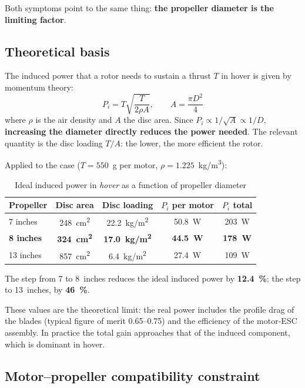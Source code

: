 Both symptoms point to the same thing: \textbf{the propeller diameter is the limiting factor}.

\subsection{Theoretical basis}
\label{subsec:propulsor-teoria}

The induced power that a rotor needs to sustain a thrust $T$ in hover is given by momentum theory:
\[
P_i = T \sqrt{\frac{T}{2\rho A}}, \qquad A = \frac{\pi D^2}{4}
\]
where $\rho$ is the air density and $A$ the disc area. Since $P_i \propto 1/\sqrt{A} \propto 1/D$, \textbf{increasing the diameter directly reduces the power needed}. The relevant quantity is the disc loading $T/A$: the lower, the more efficient the rotor.

Applied to the case ($T = 550$~g per motor, $\rho = 1.225$~kg/m\textsuperscript{3}):

\begin{table}[H]
    \centering
    \caption{Ideal induced power in \emph{hover} as a function of propeller diameter}
    \label{tab:potencia-induida}
    \small
    \begin{tabular}{lcccc}
        \toprule
        Propeller & Disc area & Disc loading & $P_i$ per motor & $P_i$ total \\
        \midrule
        7 inches & 248~cm\textsuperscript{2} & 22.2~kg/m\textsuperscript{2} & 50.8~W & 203~W \\
        \textbf{8 inches} & \textbf{324~cm\textsuperscript{2}} & \textbf{17.0~kg/m\textsuperscript{2}} & \textbf{44.5~W} & \textbf{178~W} \\
        13 inches & 857~cm\textsuperscript{2} & 6.4~kg/m\textsuperscript{2} & 27.4~W & 109~W \\
        \bottomrule
    \end{tabular}
\end{table}

The step from 7 to 8~inches reduces the ideal induced power by \textbf{12.4~\%}; the step to 13~inches, by \textbf{46~\%}.

These values are the theoretical limit: the real power includes the profile drag of the blades (typical figure of merit 0.65--0.75) and the efficiency of the motor-ESC assembly. In practice the total gain approaches that of the induced component, which is dominant in hover.

\subsection{Motor--propeller compatibility constraint}
\label{subsec:propulsor-kv}

